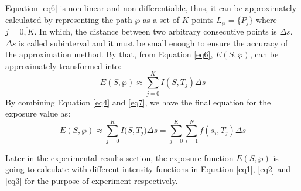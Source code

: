 \documentclass[final]{elsarticle}
\begin{document}
Equation \eqref{eq6} is non-linear and non-differentiable, thus,
it can be approximately calculated by representing the path $\wp $ as a set
of $ K $ points ${L_\wp } = \{ {P_j}\} $ where $j = \overline {0,K} $. In which, the distance between two arbitrary consecutive points is $\Delta s$. $\Delta s$ is called subinterval and it must be small enough to ensure the accuracy of the approximation method. By that, from Equation \eqref{eq6}, $ E(S,\wp ) $, can be approximately transformed into:
\begin{equation}
\label{eq7}
E(S,\wp) \approx \sum\limits_{j = 0}^K {I(S, T_j)\Delta s} 
\end{equation}
By combining Equation \eqref{eq4} and \eqref{eq7}, we have the final equation for the exposure value as:
\begin{equation}
\label{eq8}
E(S,\wp ) \approx \sum\limits_{j = 0}^K {I(S,{T_j}} )\Delta s = \sum\limits_{j = 0}^K {\sum\limits_{i = 1}^N {f({s_i},{T_j})} } \Delta s
\end{equation}

Later in the experimental results section, the exposure function $ E(S,\wp )$ is going to calculate with different intensity functions in Equation \eqref{eq1}, \eqref{eq2} and \eqref{eq3} for the purpose of experiment respectively. 
\end{document}
